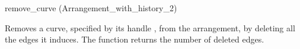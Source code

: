 
\ccRefPageBegin

\begin{ccRefFunction}{remove_curve (Arrangement_with_history_2)}



   {Removes a curve, specified by its handle , from the arrangement,
    by deleting all the edges it induces. The function returns the number of
    deleted edges.}

\end{ccRefFunction}

\ccRefPageEnd
